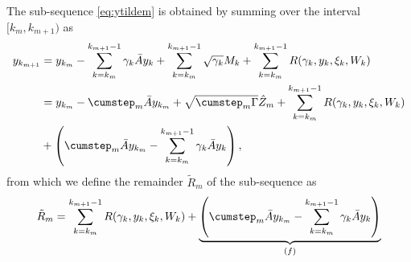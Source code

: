 \documentclass[11pt]{article}
\begin{document}
The sub-sequence \eqref{eq:ytildem} is obtained by summing over the interval $[k_m, k_{m+1})$ as
\begin{align*}
    y_{k_{m+1}} &= y_{k_m} - \sum_{k=k_m}^{k_{m+1} - 1} \gamma_k \bar{A} y_k + \sum_{k=k_m}^{k_{m+1} - 1} \sqrt{\gamma_k} M_k + \sum_{k=k_m}^{k_{m+1} - 1} R(\gamma_k, y_k, \xi_k, W_k) 
    \\&
    = y_{k_m} - \cumstep_m \bar{A} y_{k_m} + \sqrt{\cumstep_m \Gamma} \hat{Z}_m + \sum_{k=k_m}^{k_{m+1} - 1} R(\gamma_k, y_k, \xi_k, W_k)
    \\&
    + \left(\cumstep_m \bar{A} y_{k_m} - \sum_{k=k_m}^{k_{m+1} - 1} \gamma_k \bar{A} y_k \right)
 ,
\end{align*}
from which we define the remainder $\tilde{R}_m$ of the sub-sequence as 
\begin{equation}\label{eq:Rtildem}
\tilde{R}_m = \sum_{k=k_m}^{k_{m+1} - 1} R(\gamma_k, y_k, \xi_k, W_k)
+ \underbrace{\left(\cumstep_m \bar{A} y_{k_m} - \sum_{k=k_m}^{k_{m+1} - 1} \gamma_k \bar{A} y_k \right)}_{(f)}
\end{equation}
\end{document}
